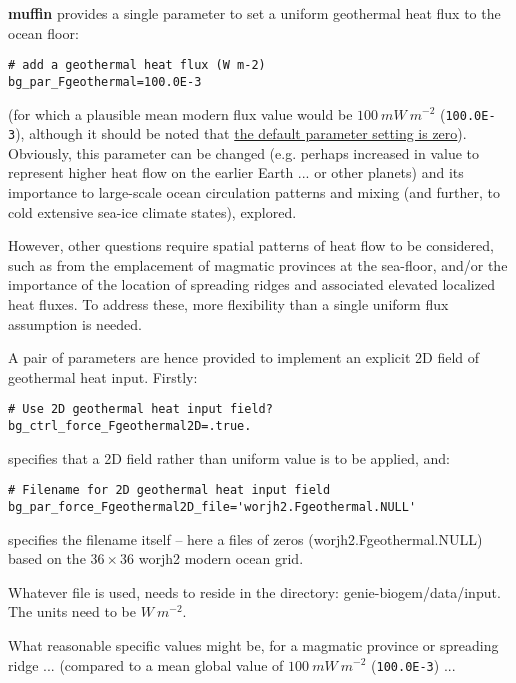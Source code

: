 \documentclass[11pt,fleqn]{book} %
\begin{document}
\textbf{muffin} provides a single parameter to set a uniform geothermal heat flux to the ocean floor:
\vspace{-1mm}\small\begin{verbatim}
# add a geothermal heat flux (W m-2)
bg_par_Fgeothermal=100.0E-3
\end{verbatim}\normalsize\vspace{-1mm}
(for which a plausible mean modern flux value would be \(100\:mW\:m^{-2}\) (\texttt{100.0E-3}), although it should be noted that \uline{the default parameter setting is zero}). Obviously, this parameter can be changed (e.g. perhaps increased in value to represent higher heat flow on the earlier Earth ... or other planets) and its importance to large-scale ocean circulation patterns and mixing (and further, to cold extensive sea-ice climate states), explored.

\vspace{1mm}
\noindent However, other questions require spatial patterns of heat flow to be considered, such as from the emplacement of magmatic provinces at the sea-floor, and/or the importance of the location of spreading ridges and associated elevated localized heat fluxes. To address these, more flexibility than a single uniform flux assumption is needed.

A pair of parameters are hence provided to implement an explicit 2D field of geothermal heat input. Firstly:
\vspace{-1mm}\small\begin{verbatim}
# Use 2D geothermal heat input field?
bg_ctrl_force_Fgeothermal2D=.true.
\end{verbatim}\normalsize\vspace{-1mm}
specifies that a 2D field rather than uniform value is to be applied, and:
\vspace{-1mm}\small\begin{verbatim}
# Filename for 2D geothermal heat input field
bg_par_force_Fgeothermal2D_file='worjh2.Fgeothermal.NULL'
\end{verbatim}\normalsize\vspace{-1mm}
specifies the filename itself -- here a files of zeros (\textsf{\footnotesize worjh2.Fgeothermal.NULL}) based on the \(36\times36\) \textsf{\footnotesize worjh2} modern ocean grid. 

Whatever file is used, needs to reside in the directory: \textsf{\footnotesize genie-biogem/data/input}. The units need to be \(W\:m^{-2}\).

What reasonable specific values might be, for a magmatic province or spreading ridge ... (compared to a mean global value of \(100\:mW\:m^{-2}\) (\texttt{100.0E-3}) ... 
\end{document}
